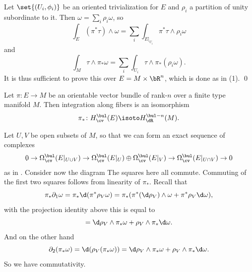     Let $\set{(U_i,\phi_i)}$ be an oriented trivialization for $E$ and $\rho_i$ a partition of unity subordinate to it.
    Then $\omega=\sum_i\rho_i\omega$, so
    $$ \int_E(\pi^*\tau)\wedge\omega = \sum_i\int_{E|_{U_i}}\pi^*\tau\wedge\rho_i\omega $$
    and
    $$ \int_M\tau\wedge\pi_*\omega = \sum_i\int_{U_i}\tau\wedge\pi_*(\rho_i\omega) . $$
    It is thus sufficient to prove this over $E=M\times\bR^n$, which is done as in (1).
    \qed

\eproof

\bthrm[title={Thom Isomorphism}, name={thomiso}]

    Let $\pi\colon E\to M$ be an orientable vector bundle of rank-$n$ over a finite type manifold $M$.
    Then integration along fibers is an isomorphism
    $$ \pi_*\colon H^\bul_\cv(E) \isoto H^{\bul-n}_\dR(M) . $$

\ethrm

\bproof

    Let $U,V$ be open subsets of $M$, so that we can form an exact sequence of complexes
    $$ 0 \to \Omega^\bul_\cv(E|_{U\cup V}) \to \Omega^\bul_\cv(E|_U) \oplus \Omega^\bul_\cv(E|_V) \to \Omega^\bul_\cv(E|_{U\cap V}) \to 0 $$
    as in .
    Consider now the diagram
    {\def\diagcolbuf{0pt}\def\diagcolwidth{0pt}
    }
    The squares here all commute.
    Commuting of the first two squares follows from linearity of $\pi_*$.
    Recall that
    $$ \pi_*\partial_1\omega = \pi_*\d(\pi^*\rho_V\omega) = \pi_*(\pi^*(\d\rho_V)\wedge\omega + \pi^*\rho_V\d\omega) , $$
    with the projection identity above this is equal to
    $$ = \d\rho_V\wedge\pi_*\omega + \rho_V\wedge\pi_*\d\omega . $$
    And on the other hand
    $$ \partial_2(\pi_*\omega) = \d(\rho_V(\pi_*\omega)) = \d\rho_V\wedge\pi_*\omega + \rho_V\wedge\pi_*\d\omega . $$
    So we have commutativity.

